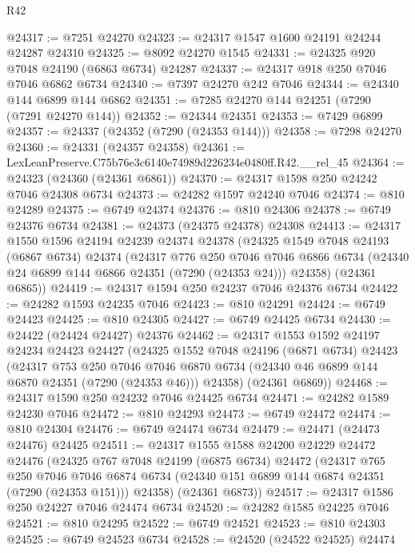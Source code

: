 \begin{lexlean}{R42}
\begin{coremodule}
{@24317 := @7251 @24270
@24323 := @24317 @1547 @1600 @24191 @24244 @24287 @24310
@24325 := @8092 @24270 @1545
@24331 := @24325 @920 @7048 @24190 (@6863 @6734) @24287
@24337 := @24317 @918 @250 @7046 @7046 @6862 @6734
@24340 := @7397 @24270 @242 @7046
@24344 := @24340 @144 @6899 @144 @6862
@24351 := @7285 @24270 @144 @24251 (@7290 (@7291 @24270 @144))
@24352 := @24344 @24351
@24353 := @7429 @6899
@24357 := @24337 (@24352 (@7290 (@24353 @144)))
@24358 := @7298 @24270
@24360 := @24331 (@24357 @24358)
@24361 := LexLeanPreserve.C75b76e3c6140e74989d226234e0480ff.R42.__rel_45
@24364 := @24323 (@24360 (@24361 @6861))
@24370 := @24317 @1598 @250 @24242 @7046 @24308 @6734
@24373 := @24282 @1597 @24240 @7046
@24374 := @810 @24289
@24375 := @6749 @24374
@24376 := @810 @24306
@24378 := @6749 @24376 @6734
@24381 := @24373 (@24375 @24378) @24308
@24413 := @24317
    @1550
    @1596
    @24194
    @24239
    @24374
    @24378
    (@24325
      @1549
      @7048
      @24193
      (@6867 @6734)
      @24374
      (@24317
        @776
        @250
        @7046
        @7046
        @6866
        @6734
        (@24340 @24 @6899 @144 @6866 @24351 (@7290 (@24353 @24)))
        @24358)
      (@24361 @6865))
@24419 := @24317 @1594 @250 @24237 @7046 @24376 @6734
@24422 := @24282 @1593 @24235 @7046
@24423 := @810 @24291
@24424 := @6749 @24423
@24425 := @810 @24305
@24427 := @6749 @24425 @6734
@24430 := @24422 (@24424 @24427) @24376
@24462 := @24317
    @1553
    @1592
    @24197
    @24234
    @24423
    @24427
    (@24325
      @1552
      @7048
      @24196
      (@6871 @6734)
      @24423
      (@24317
        @753
        @250
        @7046
        @7046
        @6870
        @6734
        (@24340 @46 @6899 @144 @6870 @24351 (@7290 (@24353 @46)))
        @24358)
      (@24361 @6869))
@24468 := @24317 @1590 @250 @24232 @7046 @24425 @6734
@24471 := @24282 @1589 @24230 @7046
@24472 := @810 @24293
@24473 := @6749 @24472
@24474 := @810 @24304
@24476 := @6749 @24474 @6734
@24479 := @24471 (@24473 @24476) @24425
@24511 := @24317
    @1555
    @1588
    @24200
    @24229
    @24472
    @24476
    (@24325
      @767
      @7048
      @24199
      (@6875 @6734)
      @24472
      (@24317
        @765
        @250
        @7046
        @7046
        @6874
        @6734
        (@24340 @151 @6899 @144 @6874 @24351 (@7290 (@24353 @151)))
        @24358)
      (@24361 @6873))
@24517 := @24317 @1586 @250 @24227 @7046 @24474 @6734
@24520 := @24282 @1585 @24225 @7046
@24521 := @810 @24295
@24522 := @6749 @24521
@24523 := @810 @24303
@24525 := @6749 @24523 @6734
@24528 := @24520 (@24522 @24525) @24474
}
\end{coremodule}
\end{lexlean}
